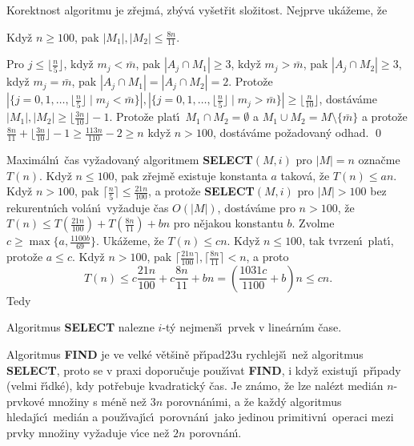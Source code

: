 \flushpar Korektnost algoritmu je z\v rejm\'a, zb\'yv\'a vy\v set\v rit 
slo\v zitost. Nej\-prve uk\'a\v zeme, \v ze

Kdy\v z $n\ge 100$, pak $|M_1|,|M_2|\le\frac {8n}{
11}$.
\endproclaim

 Pro $j\le\lfloor\frac n5\rfloor$, kdy\v z $
m_j<\bar {m}$, pak 
$|A_j\cap M_1|\ge 3$, kdy\v z $m_j>\bar {m}$, pak $|A_j\cap M_2|\ge 
3$, kdy\v z $m_j=\bar {m}$, 
pak $|A_j\cap M_1|=|A_j\cap M_2|=2$.  Proto\v ze 
$|\{j=0,1,\dots,\lfloor\frac n5\rfloor\mid m_j<\bar {m}\}|,|\{j=0
,1,\dots,\lfloor\frac n5\rfloor\mid m_j>\bar {m}\}|\ge\lfloor\frac 
n{10}\rfloor$, 
dost\'av\'ame $|M_1|,|M_2|\ge\lfloor\frac {3n}{10}\rfloor -1$.  Proto\v ze plat\'\i\ $
M_1\cap M_2=\emptyset$ 
a $M_1\cup M_2=M\setminus \{\bar {m}\}$ a proto\v ze $\frac {8n}{
11}+\lfloor\frac {3n}{10}\rfloor -1\ge\frac {113n}{110}-2\ge n$ 
kdy\v z $n>100$, dost\'av\'ame po\v zadovan\'y odhad. \qed
\enddemo

\flushpar Maxim\'aln\'\i\ \v cas vy\v zadovan\'y algoritmem  
{\bf SELECT$(M,i)$} pro $|M|=n$ ozna\v cme $T(n)$.  Kdy\v z $n\le 
100$, pak z\v rejm\v e 
exis\-tuje konstanta $a$ takov\'a, \v ze $T(n)\le an$.  Kdy\v z $
n>100$, 
pak $\lceil\frac n5\rceil\le\frac {21n}{100}$, a proto\v ze {\bf SELECT$
(M,i)$} pro $|M|>100$ bez 
rekurentn\'\i ch vol\'an\'\i\ vy\v zaduje \v cas $O(|M|)$, dost\'av\'ame pro 
$n>100$, \v ze $T(n)\le T(\frac {21n}{100})+T(\frac {8n}{11})+bn$ pro n\v ejakou konstantu 
$b$.  Zvolme $c\ge\max\{a,\frac {1100b}{69}\}$. Uk\'a\v zeme, \v ze $
T(n)\le cn$.  
Kdy\v z $n\le 100$, tak tvrzen\'\i\ plat\'\i , proto\v ze $a\le c$.  Kdy\v z 
$n>100$, pak $\lceil\frac {21n}{100}\rceil ,\lceil\frac {8n}{11}\rceil 
<n$, a proto 
$$T(n)\le c\frac {21n}{100}+c\frac {8n}{11}+bn=(\frac {1031c}{110
0}+b)n\le cn.$$
Tedy
\medskip

Algoritmus {\bf SELECT} nalezne $i$-t\'y nejmen\v s\'\i\ 
prvek v line\'arn\'\i m \v case.
\endproclaim

\flushpar Algoritmus {\bf FIND} je ve velk\'e v\v et\v sin\v e 
p\v r\'\i pad\accent23u 
rychlej\v s\'\i\ ne\v z algoritmus {\bf SELECT}, proto se v praxi 
doporu\v cuje pou\v z\'\i vat {\bf FIND}, i kdy\v z existuj\'\i\ 
p\v r\'\i pady (velmi \v r\'\i dk\'e), kdy pot\v rebuje kvadratick\'y \v cas.
Je zn\'amo, \v ze lze nal\'ezt medi\'an $n$-prvkov\'e mno\v ziny s 
m\'en\v e ne\v z $3n$ porov\-n\'an\'\i mi, a \v ze ka\v zd\'y algoritmus hledaj\'\i c\'\i\ 
medi\'an a pou\v z\'\i vaj\'\i c\'\i\ porov\-n\'an\'\i\ jako jedinou primi\-tivn\'\i\ 
operaci mezi prvky mno\v ziny vy\v zaduje v\'\i ce ne\v z $2n$ 
porov\-n\'an\'\i .
\medskip

